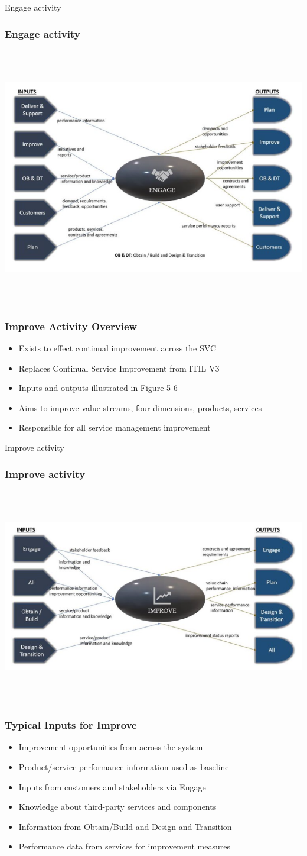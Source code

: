\documentclass[aspectratio=169, table]{beamer}
\begin{document}
\begin{frame}{Engage activity} 	 \frametitle{ Engage activity} \begin{center} 	\includegraphics[width=0.6\linewidth]{images/image-04.png} \end{center} \end{frame}

\begin{frame}
	\frametitle{Improve Activity Overview}
	\begin{itemize}
		\item Exists to effect continual improvement across the SVC
		\item Replaces Continual Service Improvement from ITIL V3
		\item Inputs and outputs illustrated in Figure 5-6
		\item Aims to improve value streams, four dimensions, products, services
		\item Responsible for all service management improvement
	\end{itemize}
\end{frame}

\begin{frame}{Improve activity} 	 \frametitle{ Improve activity} \begin{center} 	\includegraphics[width=0.6\linewidth]{images/image-05.png} \end{center} \end{frame}

\begin{frame}
	\frametitle{Typical Inputs for Improve}
	\begin{itemize}
		\item Improvement opportunities from across the system
		\item Product/service performance information used as baseline
		\item Inputs from customers and stakeholders via Engage
		\item Knowledge about third-party services and components
		\item Information from Obtain/Build and Design and Transition
		\item Performance data from services for improvement measures
	\end{itemize}
\end{frame}
\end{document}
